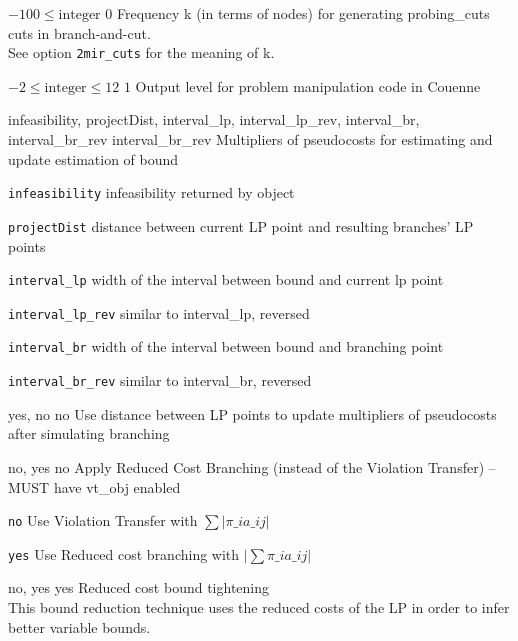 %
{$-100\leq\textrm{integer}$}%
{$0$}%
{Frequency k (in terms of nodes) for generating probing\_cuts cuts in branch-and-cut.\\
See option \texttt{2mir\_cuts} for the meaning of k.}%
{}

%
{$-2\leq\textrm{integer}\leq12$}%
{$1$}%
{Output level for problem manipulation code in Couenne}%
{}

%
{\ttfamily infeasibility, projectDist, interval\_lp, interval\_lp\_rev, interval\_br, interval\_br\_rev}%
{interval\_br\_rev}%
{Multipliers of pseudocosts for estimating and update estimation of bound}%
{\begin{list}{}{
\setlength{\parsep}{0em}
\setlength{\leftmargin}{5ex}
\setlength{\labelwidth}{2ex}
\setlength{\itemindent}{0ex}
\setlength{\topsep}{0pt}}
\item[\texttt{infeasibility}] infeasibility returned by object
\item[\texttt{projectDist}] distance between current LP point and resulting branches' LP points
\item[\texttt{interval\_lp}] width of the interval between bound and current lp point
\item[\texttt{interval\_lp\_rev}] similar to interval\_lp, reversed
\item[\texttt{interval\_br}] width of the interval between bound and branching point
\item[\texttt{interval\_br\_rev}] similar to interval\_br, reversed
\end{list}
}

%
{\ttfamily yes, no}%
{no}%
{Use distance between LP points to update multipliers of pseudocosts after simulating branching}%
{}

%
{\ttfamily no, yes}%
{no}%
{Apply Reduced Cost Branching (instead of the Violation Transfer) -- MUST have vt\_obj enabled}%
{\begin{list}{}{
\setlength{\parsep}{0em}
\setlength{\leftmargin}{5ex}
\setlength{\labelwidth}{2ex}
\setlength{\itemindent}{0ex}
\setlength{\topsep}{0pt}}
\item[\texttt{no}] Use Violation Transfer with $\sum |\pi\_i a\_{ij}|$
\item[\texttt{yes}] Use Reduced cost branching with $|\sum \pi\_i a\_{ij}|$
\end{list}
}

%
{\ttfamily no, yes}%
{yes}%
{Reduced cost bound tightening\\
This bound reduction technique uses the reduced costs of the LP in order to infer better variable bounds.}%
{}

